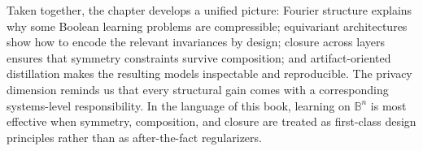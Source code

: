 \documentclass[11pt]{article}
\begin{document}
Taken together, the chapter develops a unified picture: Fourier structure explains why some Boolean learning problems are compressible; equivariant architectures show how to encode the relevant invariances by design; closure across layers ensures that symmetry constraints survive composition; and artifact-oriented distillation makes the resulting models inspectable and reproducible. The privacy dimension reminds us that every structural gain comes with a corresponding systems-level responsibility. In the language of this book, learning on \(\mathbb{B}^n\) is most effective when symmetry, composition, and closure are treated as first-class design principles rather than as after-the-fact regularizers.
\end{document}
